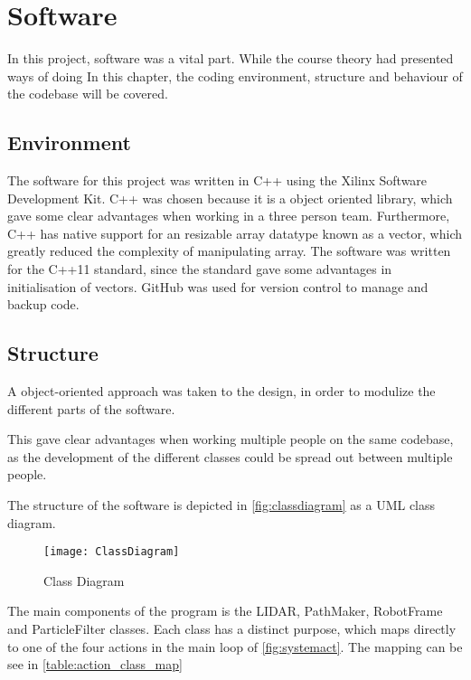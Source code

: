 \documentclass[Main]{subfiles}
\begin{document}
\section{Software} %
\label{sec:software}

	In this project, software was a vital part. 
	While the course theory had presented ways of doing 
	In this chapter, the coding environment, structure and behaviour of the codebase will be covered.
	
	\subsection{Environment} %
	\label{sub:software_environment}

		The software for this project was written in C++ using the Xilinx Software Development Kit.
		C++ was chosen because it is a object oriented library, which gave some clear advantages when working in a three person team.
		Furthermore, C++ has native support for an resizable array datatype known as a vector, which greatly reduced the complexity of manipulating array.
		The software was written for the C++11 standard, since the standard gave some advantages in initialisation of vectors.
		GitHub was used for version control	to manage and backup code.
		
	\subsection{Structure} %
	\label{sub:software_structure}
	
		A object-oriented approach was taken to the design, in order to modulize the different parts of the software. 
		
		This gave clear advantages when working multiple people on the same codebase, as the development of the different classes could be spread out between multiple people.
		
		The structure of the software is depicted in \autoref{fig:classdiagram} as a UML class diagram.
		
		\begin{figure}[H]
			\centering
			\texttt{[image: ClassDiagram]}
			\caption{Class Diagram}
			\label{fig:classdiagram}
		\end{figure}


		The main components of the program is the LIDAR, PathMaker, RobotFrame and ParticleFilter classes. 
		Each class has a distinct purpose, which maps directly to one of the four  actions in the main loop of \autoref{fig:systemact}.
		The mapping can be see in \autoref{table:action_class_map}
		 
\end{document}
